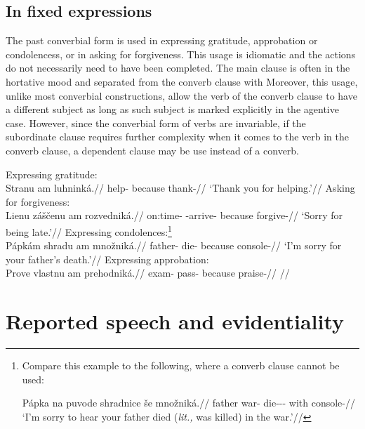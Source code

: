 \subsection{In fixed expressions}

The past converbial form is used in expressing gratitude, approbation or condolencess, or in asking for forgiveness. This usage is idiomatic and the actions do not necessarily need to have been completed. The main clause is often in the hortative mood and separated from the converb clause with  Moreover, this usage, unlike most converbial constructions, allow the verb of the converb clause to have a different subject as long as such subject is marked explicitly in the agentive case. However, since the converbial form of verbs are invariable, if the subordinate clause requires further complexity when it comes to the verb in the converb clause, a dependent  clause may be use instead of a converb.

\pex
\a Expressing gratitude:\\
\begingl
\gla Stranu am luhninká.//
\glb help- because thank-//
\glft `Thank you for helping.'//
\endgl
\a Asking for forgiveness:\\
\begingl
\gla Lienu záščenu am rozvedniká.//
\glb on:time-\Ins{} \Neg{}-arrive- because forgive-//
\glft `Sorry for being late.'//
\endgl
\a Expressing condolences:\footnote{Compare this example to the following, where a converb clause cannot be used:

\ex[lingstyle=fnex,belowexskip=-1em]
\begingl
\gla Pápka na puvode shradnice še množniká.//
\glb father \Loc{} war-\Pat{} die-\Pv{}-\Pf{}-\Quot{} with console-//
\glft `I'm sorry to hear your father died (\emph{lit.,} was killed) in the war.'//
\endgl\xe}\\
\begingl
\gla Pápkám shradu am množniká.//
\glb father- die- because console-//
\glft `I'm sorry for your father's death.'//
\endgl
\a Expressing approbation:\\
\begingl
\gla Prove vlastnu am prehodniká.//
\glb exam-\Pat{} pass- because praise-//
\glft {}//
\endgl
\xe


\section{Reported speech and evidentiality}\label{sec:reportedspeech}

